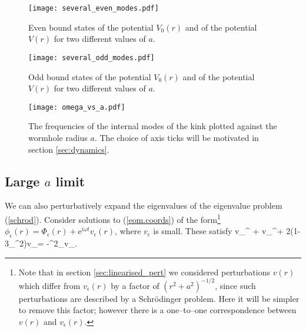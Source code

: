 

\begin{figure}
\texttt{[image: several\_even\_modes.pdf]}
\caption{\label{fig:even_states} Even bound states of the potential $V_0(r)$ and of the potential $V(r)$ for two different values of $a$.}
\end{figure}

\begin{figure}
\texttt{[image: several\_odd\_modes.pdf]}
\caption{\label{fig:odd_states} Odd bound states of the potential $V_0(r)$ and of the potential $V(r)$ for two different values of $a$.}
\end{figure}

\begin{figure}
\texttt{[image: omega\_vs\_a.pdf]}
\caption{\label{fig:omega_vs_a} The frequencies of the internal modes of the kink plotted against the wormhole radius $a$. The choice of axis ticks will be motivated in section \ref{sec:dynamics}.}
\end{figure}


\subsection{Large $a$ limit}

We can also perturbatively expand the eigenvalues of the eigenvalue problem (\ref{schrod}). Consider solutions to (\ref{eom.coords}) of the form\footnote{Note that in section \ref{sec:linearised_pert} we considered perturbations $v(r)$ which differ from $v_\epsilon(r)$ by a factor of $(r^2+a^2)^{-1/2}$, since such perturbations are described by a Schr\"odinger problem. Here it will be simpler to remove this factor; however there is a one--to--one correspondence between $v(r)$ and $v_\epsilon(r)$.} $\phi_\epsilon(r)=\Phi_\epsilon(r)+\mathrm{e}^{i\omega t}v_\epsilon(r)$, where $v_\epsilon$ is small.
These satisfy
\be
\label{eq:perturbed_large_a}
v_\epsilon^{\prime\prime} + v_\epsilon^\prime + 2(1-3\Phi_\epsilon^2)v_\epsilon = -\omega^2_\epsilon v_\epsilon.
\ee

